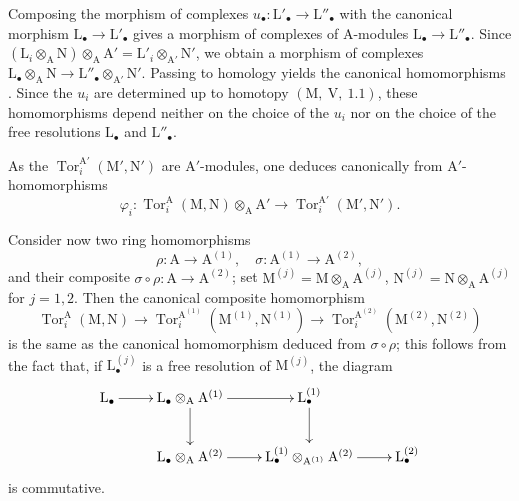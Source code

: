 Composing the morphism of complexes
$u_\bullet:\mathrm{L}'_\bullet\to\mathrm{L}''_\bullet$ with the canonical
morphism $\mathrm{L}_\bullet\to\mathrm{L}'_\bullet$ gives a morphism of
complexes of $\mathrm{A}$-modules
$\mathrm{L}_\bullet\to\mathrm{L}''_\bullet$. Since $(\mathrm{L}_i\otimes_\mathrm{A}\mathrm{N})
\otimes_\mathrm{A}\mathrm{A}'
=\mathrm{L}'_i\otimes_{\mathrm{A}'}\mathrm{N}'$,
we obtain a morphism of complexes $\mathrm{L}_\bullet\otimes_\mathrm{A}\mathrm{N}
\longrightarrow
\mathrm{L}''_\bullet\otimes_{\mathrm{A}'}\mathrm{N}'$.
Passing to homology yields the canonical homomorphisms
. Since the $u_i$ are determined up to
homotopy $(\mathrm{M},~\mathrm{V},~1.1)$, these homomorphisms depend
neither on the choice of the $u_i$ nor on the choice of the free
resolutions $\mathrm{L}_\bullet$ and $\mathrm{L}''_\bullet$.

As the $\operatorname{Tor}_i^{\mathrm{A}'}(\mathrm{M}',\mathrm{N}')$ are $\mathrm{A}'$-modules, one deduces canonically from  $\mathrm{A}'$-homomorphisms
\begin{equation}
  \varphi_i:\operatorname{Tor}_i^\mathrm{A}(\mathrm{M},\mathrm{N})\otimes_\mathrm{A}\mathrm{A}'\to\operatorname{Tor}_i^{\mathrm{A}'}(\mathrm{M}',\mathrm{N}').
  \label{IV.11.2.1.5}
\tag{11.2.1.5}
\end{equation}

Consider now two ring homomorphisms
\[
  \rho:\mathrm{A}\to\mathrm{A}^{(1)},\quad \sigma:\mathrm{A}^{(1)}\to\mathrm{A}^{(2)},
\]
and their composite $\sigma\circ\rho:\mathrm{A}\to\mathrm{A}^{(2)}$; set $\mathrm{M}^{(j)}=\mathrm{M}\otimes_\mathrm{A}\mathrm{A}^{(j)}$, $\mathrm{N}^{(j)}=\mathrm{N}\otimes_\mathrm{A}\mathrm{A}^{(j)}$ for $j=1,2$. Then the canonical composite homomorphism
\[
  \operatorname{Tor}_i^\mathrm{A}(\mathrm{M},\mathrm{N})
  \longrightarrow
  \operatorname{Tor}_i^{\mathrm{A}^{(1)}}
    (\mathrm{M}^{(1)},\mathrm{N}^{(1)})
  \longrightarrow
  \operatorname{Tor}_i^{\mathrm{A}^{(2)}}
    (\mathrm{M}^{(2)},\mathrm{N}^{(2)})
\]
is the same as the canonical homomorphism deduced from $\sigma\circ\rho$; this follows from the fact that, if $\mathrm{L}_\bullet^{(j)}$ is a free resolution of $\mathrm{M}^{(j)}$, the diagram
\[
\xymatrix{
  \mathrm{L}_\bullet \ar[r] & \mathrm{L}_\bullet\otimes_\mathrm{A}\mathrm{A}^{(1)} \ar[r] \ar[d] & \mathrm{L}_\bullet^{(1)} \ar[d] \\
  & \mathrm{L}_\bullet\otimes_\mathrm{A}\mathrm{A}^{(2)} \ar[r] &
  \mathrm{L}_\bullet^{(1)}\otimes_{\mathrm{A}^{(1)}}\mathrm{A}^{(2)} \ar[r] & \mathrm{L}_\bullet^{(2)}
}
\]
is commutative.

